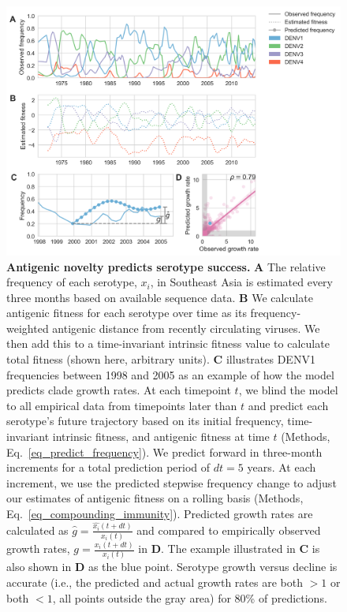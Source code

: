 \documentclass[11pt,oneside,letterpaper]{article}
\begin{document}
\begin{figure}[h]
  \begin{centering}
    \includegraphics[width=\linewidth]{../figures/png/serotype_fitness_model.png}
  	\caption{\textbf{Antigenic novelty predicts serotype success.}
    \textbf{A} The relative frequency of each serotype, $x_i$, in Southeast Asia is estimated every three months based on available sequence data.
    \textbf{B} We calculate antigenic fitness for each serotype over time as its frequency-weighted antigenic distance from recently circulating viruses.
    We then add this to a time-invariant intrinsic fitness value to calculate total fitness (shown here, arbitrary units).
    \textbf{C} illustrates DENV1 frequencies between 1998 and 2005 as an example of how the model predicts clade growth rates.
    At each timepoint $t$, we blind the model to all empirical data from timepoints later than $t$ and predict each serotype's future trajectory based on its initial frequency, time-invariant intrinsic fitness, and antigenic fitness at time $t$ (Methods, Eq.~\ref{eq_predict_frequency}).
    We predict forward in three-month increments for a total prediction period of $dt = 5$ years.
    At each increment, we use the predicted stepwise frequency change to adjust our estimates of antigenic fitness on a rolling basis (Methods, Eq.~\ref{eq_compounding_immunity}).
    Predicted growth rates are calculated as $\hat{g} = \frac{\hat{x_i}(t+dt)}{x_i(t)}$ and compared to empirically observed growth rates, $g = \frac{x_i(t+dt)}{x_i(t)}$ in \textbf{D}.
    The example illustrated in \textbf{C} is also shown in \textbf{D} as the blue point.
    Serotype growth versus decline is accurate (i.e., the predicted and actual growth rates are both $>1$ or both $<1$, all points outside the gray area) for 80\% of predictions.
    }
  	\label{serotype_fitness_model}
  \end{centering}
\end{figure}
\end{document}
